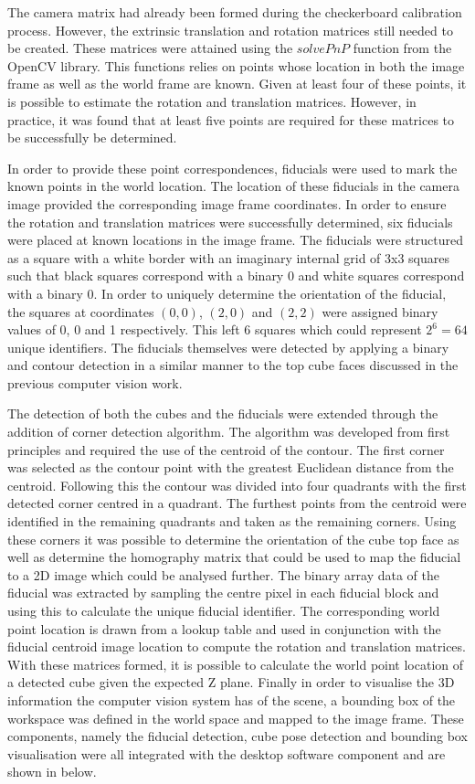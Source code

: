 The camera matrix had already been formed during the checkerboard calibration process. However, the extrinsic translation and rotation matrices still needed to be created. These matrices were attained using the $\textit{solvePnP}$ function from the OpenCV library. This functions relies on points whose location in both the image frame as well as the world frame are known. Given at least four of these points, it is possible to estimate the rotation and translation matrices. However, in practice, it was found that at least five points are required for these matrices to be successfully be determined. 

In order to provide these point correspondences, fiducials were used to mark the known points in the world location. The location of these fiducials in the camera image provided the corresponding image frame coordinates. In order to ensure the rotation and translation matrices were successfully determined, six fiducials were placed at known locations in the image frame. The fiducials were structured as a square with a white border with an imaginary internal grid of 3x3 squares such that black squares correspond with a binary 0 and white squares correspond with a binary 0. In order to uniquely determine the orientation of the fiducial, the squares at coordinates $(0, 0)$, $(2, 0)$ and $(2,2)$ were assigned binary values of 0, 0 and 1 respectively. This left 6 squares which could represent $2^6=64$ unique identifiers. The fiducials themselves were detected by applying a binary and contour detection in a similar manner to the top cube faces discussed in the previous computer vision work.

The detection of both the cubes and the fiducials were extended through the addition of corner detection algorithm. The algorithm was developed from first principles and required the use of the centroid of the contour. The first corner was selected as the contour point with the greatest Euclidean distance from the centroid. Following this the contour was divided into four quadrants with the first detected corner centred in a quadrant. The furthest points from the centroid were identified in the remaining quadrants and taken as the remaining corners. Using these corners it was possible to determine the orientation of the cube top face as well as determine the homography matrix that could be used to map the fiducial to a 2D image which could be analysed further. The binary array data of the fiducial was extracted by sampling the centre pixel in each fiducial block and using this to calculate the unique fiducial identifier. The corresponding world point location is drawn from a lookup table and used in conjunction with the fiducial centroid image location to compute the rotation and translation matrices. With these matrices formed, it is possible to calculate the world point location of a detected cube given the expected Z plane. Finally in order to visualise the 3D information the computer vision system has of the scene, a bounding box of the workspace was defined in the world space and mapped to the image frame. These components, namely the fiducial detection, cube pose detection and bounding box visualisation were all integrated with the desktop software component and are shown in  below.

